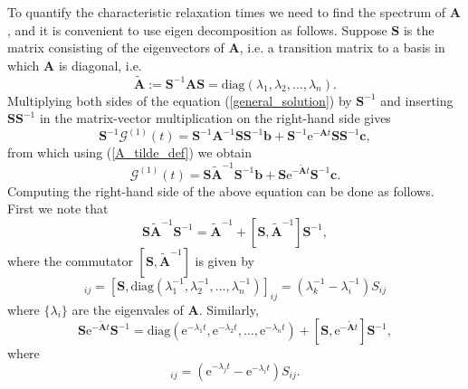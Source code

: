 \documentclass[a4paper, 11pt]{article}
\begin{document}
To quantify the characteristic relaxation times we need to find the spectrum of $\mathbf A$, and it is convenient to use eigen decomposition as follows. Suppose $\mathbf S$ is the matrix consisting of the eigenvectors of $\mathbf A$, i.e. a transition matrix to a basis in which $\mathbf A$ is diagonal, i.e.
\begin{equation} \label{A_tilde_def}
  \tilde{\mathbf A} := \mathbf S^{-1}\mathbf A\mathbf S = \text{diag}(\lambda_1, \lambda_2, ..., \lambda_n).
\end{equation}
Multiplying both sides of the equation (\ref{general_solution}) by $\mathbf S^{-1}$ and inserting $\mathbf S\mathbf S^{-1}$ in the matrix-vector multiplication on the right-hand side gives
\begin{equation*}
  \mathbf S^{-1} \boldsymbol{\mathcal G}^{(1)}(t) = \mathbf S^{-1}\mathbf A^{-1}\mathbf S\mathbf S^{-1}\mathbf b + \mathbf S^{-1}\mathrm e^{-\mathbf A t}\mathbf S\mathbf S^{-1}\mathbf c,
\end{equation*}
from which using (\ref{A_tilde_def}) we obtain
\begin{equation}
  \boldsymbol{\mathcal G}^{(1)}(t) = \mathbf S\tilde{\mathbf A}^{-1}\mathbf S^{-1}\mathbf b + \mathbf S\mathrm e^{-\tilde{\mathbf A} t}\mathbf S^{-1}\mathbf c.
\end{equation}
Computing the right-hand side of the above equation can be done as follows. First we note that%
\begin{equation}
  \mathbf S\tilde{\mathbf A}^{-1}\mathbf S^{-1} = \tilde{\mathbf A}^{-1} + [\mathbf S, \tilde{\mathbf A}^{-1}]\mathbf S^{-1},
\end{equation}
where the commutator $[\mathbf S, \tilde{\mathbf A}^{-1}]$ is given by
\begin{equation}
  [\mathbf S, \tilde{\mathbf A}^{-1}]_{ij} = [\mathbf S, \text{diag}(\lambda_1^{-1}, \lambda_2^{-1}, ... , \lambda_n^{-1})]_{ij} = (\lambda_k^{-1}-\lambda_i^{-1})S_{ij}
\end{equation}
where $\{\lambda_i\}$ are the eigenvales of $\mathbf A$. Similarly,
\begin{equation}
  \mathbf S\mathrm e^{-\tilde{\mathbf A} t}\mathbf S^{-1} = \text{diag}(\mathrm e^{-\lambda_1t}, \mathrm e^{-\lambda_2t},\dots,\mathrm e^{-\lambda_nt}) + [\mathbf S, \mathrm e^{-\tilde{\mathbf A} t}]\mathbf S^{-1},
\end{equation}
where
\begin{equation}
  [\mathbf S, \mathrm e^{-\tilde{\mathbf A} t}]_{ij} = (\mathrm e^{-\lambda_jt}-\mathrm e^{-\lambda_it})S_{ij}.
\end{equation}
\end{document}
